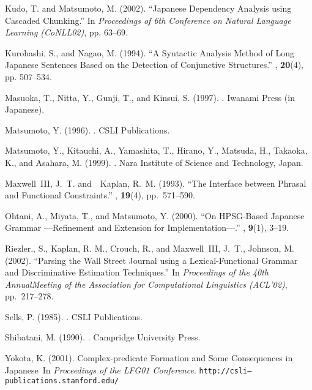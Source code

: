 \documentclass[english]{jnlp_1.4_rep}
\begin{document}
\begin{thebibliography}{}
Kudo, T. and  Matsumoto, M. (2002).
\newblock ``Japanese Dependency Analysis using Cascaded Chunking.''
\newblock In {\em Proceedings of 6th Conference on
Natural Language Learning (CoNLL02)}, pp. 63--69.

Kurohashi, S., and Nagao, M. (1994). 
\newblock ``A Syntactic Analysis Method of Long Japanese Sentences Based on the Detection of Conjunctive Structures.'' 
, \textbf{20}(4), pp. 507--534.

Masuoka, T., Nitta, Y., Gunji, T., and Kinsui, S. (1997). 
.
\newblock Iwanami Press (in Japanese).


Matsumoto, Y. (1996). 
.
\newblock CSLI Publications.


Matsumoto, Y., Kitauchi, A., Yamashita, T., Hirano, Y., Matsuda, H., Takaoka, K., and  Asahara, M.  (1999).
.
\newblock Nara Institute of Science and
Technology, Japan.

Maxwell~III, J.~T. and\  \ Kaplan, R.~M. (1993).
\newblock ``The Interface between Phrasal and Functional Constraints.'' 
, \textbf{19}(4), pp.~571--590.

Ohtani, A.,  Miyata, T., and Matsumoto, Y. (2000). 
\newblock ``On HPSG-Based Japanese Grammar 
---Refinement and Extension for Implementation---.'' 
, \textbf{9}(1), 3--19.

Riezler., S., Kaplan, R. M., Crouch, R., and Maxwell~III, J.~T., Johnson, M. (2002).
\newblock ``Parsing the Wall
Street Journal using a Lexical-Functional Grammar and Discriminative Estimation Techniques.'' 
\newblock In {\em Proceedings of the 40th AnnualMeeting of the Association for Computational Linguistics (ACL'02)}, pp.~217--278.

Sells, P. (1985).
.
\newblock CSLI Publications.

Shibatani, M. (1990).
.
\newblock Campridge University Press.

Yokota, K. (2001).
\newblock Complex-predicate Formation and Some Consequences in
  Japanese\
\newblock In {\em Proceedings of the LFG01 Conference}. 
\texttt{http://csli--publications.stanford.edu/}


\end{thebibliography}
\end{document}
